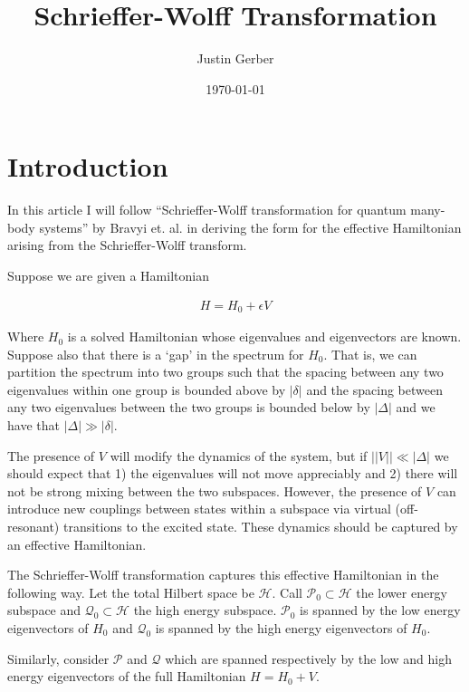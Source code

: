 \documentclass[12pt]{article}
\begin{document}
\title{Schrieffer-Wolff Transformation}
\author{Justin Gerber}
\date{\today}
\maketitle

\section{Introduction}

In this article I will follow ``Schrieffer-Wolff transformation for quantum many-body systems'' by Bravyi et. al. in deriving the form for the effective Hamiltonian arising from the Schrieffer-Wolff transform.

Suppose we are given a Hamiltonian 

\begin{align}
H = H_0 + \epsilon V
\end{align}

Where $H_0$ is a solved Hamiltonian whose eigenvalues and eigenvectors are known. Suppose also that there is a `gap' in the spectrum for $H_0$. That is, we can partition the spectrum into two groups such that the spacing between any two eigenvalues within one group is bounded above by $|\delta|$ and the spacing between any two eigenvalues between the two groups is bounded below by $|\Delta|$ and we have that $|\Delta| \gg |\delta|$.

The presence of $V$ will modify the dynamics of the system, but if $||V|| \ll |\Delta|$ we should expect that 1) the eigenvalues will not move appreciably and 2) there will not be strong mixing between the two subspaces. However, the presence of $V$ can introduce new couplings between states within a subspace via virtual (off-resonant) transitions to the excited state. These dynamics should be captured by an effective Hamiltonian.

The Schrieffer-Wolff transformation captures this effective Hamiltonian in the following way.
Let the total Hilbert space be $\mathcal{H}$. Call $\mathcal{P}_0 \subset
\mathcal{H}$ the lower energy subspace and $\mathcal{Q}_0 \subset \mathcal{H}$ the high energy subspace. $\mathcal{P}_0$ is spanned by the low energy eigenvectors of $H_0$ and $\mathcal{Q}_0$ is spanned by the high energy eigenvectors of $H_0$.

Similarly, consider $\mathcal{P}$ and $\mathcal{Q}$ which are spanned respectively by the low and high energy eigenvectors of the full Hamiltonian $H=H_0+V$.
\end{document}
